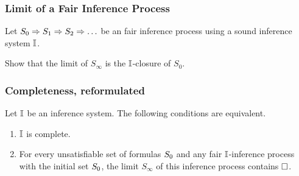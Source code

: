 

                                              
	   \begin{frame}\frametitle{Limit of a Fair Inference Process}

  Let ${S_0 \Rightarrow S_1 \Rightarrow S_2 \Rightarrow \ldots}$ be an fair inference
  process using a sound inference system ${\mathbb{I}}$. 

\medskip

 Show that the limit of $S_\infty$ is the
${\mathbb{I}}$-closure of $S_0$. 

                           \end{frame}


        	   \begin{frame}\frametitle{Completeness, reformulated}

\textbf{}
Let ${\mathbb{I}}$ be an inference system.
The following conditions are equivalent.

\begin{enumerate}
\item ${\mathbb{I}}$ is complete.
\bigskip
  
\item For every unsatisfiable set of formulas ${S_0}$ and any
  fair ${\mathbb{I}}$-inference process with the initial set ${S_0}$, 
  the limit $S_\infty$ of this inference process contains ${\Box}$.
\end{enumerate}

                           \end{frame}


